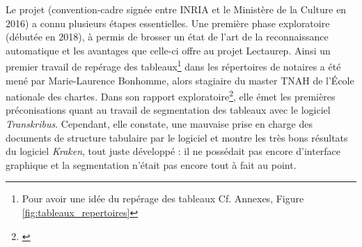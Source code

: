Le projet (convention-cadre signée entre INRIA et le Ministère de la Culture en 2016) a connu plusieurs étapes essentielles. Une première phase exploratoire (débutée en 2018), à permis de brosser un état de l'art de la reconnaissance automatique et les avantages que celle-ci offre au projet Lectaurep. Ainsi un premier travail de repérage des tableaux\footnote{Pour avoir une idée du repérage des tableaux Cf. Annexes, Figure \ref{fig:tableaux_repertoires}} dans les répertoires de notaires a été mené par Marie-Laurence Bonhomme, alors stagiaire du master TNAH de l'École nationale des chartes. Dans son rapport exploratoire\footnote{\cite{bonhomme_repertoire_2018}}, elle émet les premières préconisations quant au travail de segmentation des tableaux avec le logiciel \textit{Transkribus}. Cependant, elle constate, une mauvaise prise en charge des documents de structure tabulaire par le logiciel et montre les très bons résultats du logiciel \textit{Kraken}, tout juste développé : il ne possédait pas encore d'interface graphique et la segmentation n'était pas encore tout à fait au point.\\ 

